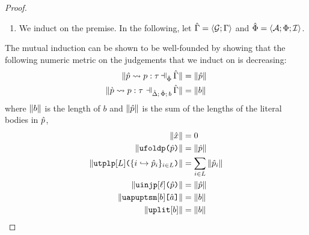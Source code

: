 \begin{proof}
\begin{enumerate}
\begin{byCases}
  \end{byCases}
\item We induct on the premise. In the following, let $\hat\Gamma=\langle \mathcal{G}; \Gamma \rangle$ and $\hat\Phi=\langle \mathcal{A}; \Phi; \mathcal{I} \rangle$.
\end{enumerate}
The mutual induction can be shown to be well-founded by showing that the following numeric metric on the judgements that we induct on is decreasing:
\begin{align*}
\sizeof{\patExpands{\upctx}{\uPhi}{\upv}{p}{\tau}} & = \sizeof{\upv}\\
\sizeof{{\cvalidP{\upctx}{\pscene{\uDelta}{\uPhi}{b}}{\cpv}{p}{\tau}}} & = \sizeof{b}
\end{align*}
where $\Vert b \Vert$ is the length of $b$ and $\Vert \hat{p} \Vert$ is the sum of the lengths of the literal bodies in $\hat{p}$,
\begin{align*}
\Vert {\hat x} \Vert & = 0\\
\Vert \texttt{ufoldp}\texttt{(}\hat{p}\texttt{)} \Vert & = \Vert \hat{p} \Vert\\
\Vert \texttt{utplp}[L]\texttt{(}\{i \hookrightarrow \hat{p}_{i}\}_{i \in L}\texttt{)} \Vert & = \sum_{i \in L} \Vert \hat{p}_i \Vert\\
\Vert \texttt{uinjp}[\ell]\texttt{(}\hat{p}\texttt{)} \Vert & = \Vert \hat{p} \Vert\\
\Vert \texttt{uapuptsm}[b]\texttt{[}\hat{a}\texttt{]} \Vert & = \Vert b \Vert\\
\Vert \texttt{uplit}[b] \Vert & = \Vert b \Vert
\end{align*}


\end{proof}
